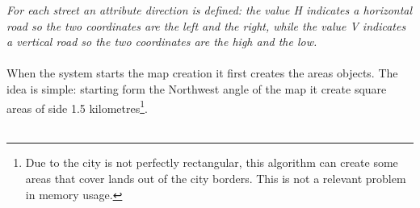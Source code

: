 \documentclass[\mainpath/main]{subfiles}
\begin{document}
\textit{For each street an attribute direction is defined: the value H indicates a horizontal road so the two coordinates are the left and the right, while the value V indicates a vertical road so the two coordinates are the high and the low.}\\
\\
When the system starts the map creation it first creates the areas objects. The idea is simple: starting form the Northwest angle of the map it create square areas of side 1.5 kilometres\footnote{Due to the city is not perfectly rectangular, this algorithm can create some areas that cover lands out of the city borders. This is not a relevant problem in memory usage.}.\\

\\[0.5cm]
	
\end{document}
